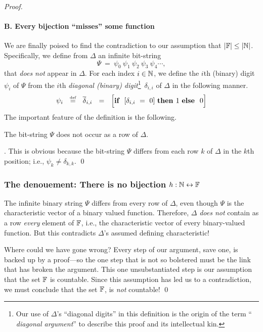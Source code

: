 \begin{proof}
\paragraph{B. Every bijection ``misses'' some function}

We are finally poised to find the contradiction to our assumption that
$|\mathbb{F}| \leq |\mathbb{N}|$.  Specifically, we define from $\Delta$ an infinite
bit-string
\[ \Psi \ = \ \psi_0 \ \psi_1 \ \psi_2 \ \psi_3 \ \psi_4 \cdots, \]
that {\em does not} appear in $\Delta$.  For each index $i \in \mathbb{N}$, we
define the $i$th (binary) digit $\psi_i$ of $\Psi$ from the $i$th {\em
  diagonal (binary) digit}\footnote{Our use of $\Delta$'s ``diagonal
  digits'' in this definition is the origin of the term ``{\em
    diagonal argument}''  to describe this
  proof and its intellectual kin.}~$\delta_{i,i}$ of $\Delta$ in the
following manner.
\[ \psi_i \ \ \stackrel{\mbox{{\tiny def}}}{=} \ \ \overline{\delta}_{i,i} \ \ = \ \
\Big[\mbox{\bf if } \ [\delta_{i,i} \ = \ 0] \ \mbox{\bf then } 1 \
\mbox{\bf else } \ 0 \Big]
\]
The important feature of the definition is the following.

\begin{lemma}
\label{lem:PSI-notin-DELTA}
The bit-string $\Psi$ does not occur as a row of $\Delta$.
\end{lemma}

.
This is obvious because the bit-string
$\Psi$ differs from each row $k$ of $\Delta$ in the $k$th position; i.e.,
$\psi_k \neq \delta_{k,k}$.  \qed

\subsubsection{The denouement: There is no bijection  $h: \mathbb{N} \leftrightarrow \mathbb{F}$}

The infinite binary string $\Psi$ differs from every row of $\Delta$,
even though $\Psi$ is the characteristic vector of a binary valued
function.  Therefore, $\Delta$ {\em does not} contain as a row {\em
  every} element of $\mathbb{F}$, i.e., the characteristic vector of every
binary-valued function.  But this contradicts $\Delta$'s assumed
defining characteristic!

Where could we have gone wrong?  Every step of our argument, save one,
is backed up by a proof---so the one step that is not so bolstered
must be the link that has broken the argument.  This one
unsubstantiated step is our assumption that the set $\mathbb{F}$ is countable.
Since this assumption has led us to a contradiction, we must conclude
that the set $\mathbb{F}$, is {\em not} countable!  \qed
\end{proof}

